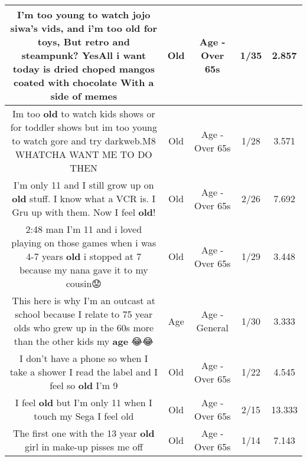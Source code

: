\documentclass[11pt]{article}
\newlength\mylength
\begin{document}
\begin{center}
\begin{longtable}{|C{.65\mylength}|C{.30\mylength}|C{.12\mylength}|C{.12\mylength}|C{.12\mylength}|}
  \small I'm too young to watch jojo siwa's vids, and i'm too \textbf{old} for toys, But retro and steampunk? YesAll i want today is dried choped mangos coated with chocolate  With a side of memes\normalsize   & Old & Age - Over 65s & 1/35 & 2.857 \\  \hline
  \small Im too \textbf{old} to watch kids shows or for toddler shows but im too young to watch gore and try darkweb.M8 WHATCHA WANT ME TO DO THEN\normalsize   & Old & Age - Over 65s & 1/28 & 3.571 \\  \hline
  \small I'm only 11 and I still grow up on \textbf{old} stuff. I know what a VCR is. I Gru up with them. Now I feel \textbf{old}!\normalsize   & Old & Age - Over 65s & 2/26 & 7.692 \\  \hline
  \small 2:48 man I'm 11 and i loved playing on those games when i was 4-7 years \textbf{old} i stopped at 7 because my nana gave it to my cousin😟\normalsize   & Old & Age - Over 65s & 1/29 & 3.448 \\  \hline
  \small This here is why I'm an outcast at school because I relate to 75 year olds who grew up in the 60s more than the other kids my \textbf{age} 😂😂\normalsize   & Age & Age - General & 1/30 & 3.333 \\  \hline
  \small I don't have a phone so when I take a shower I read the label and I feel so \textbf{old} I'm 9\normalsize   & Old & Age - Over 65s & 1/22 & 4.545 \\  \hline
  \small I feel \textbf{old} but I'm only 11 when I touch my Sega I feel old\normalsize   & Old & Age - Over 65s & 2/15 & 13.333 \\  \hline
  \small The first one with the 13 year \textbf{old} girl in make-up pisses me off\normalsize   & Old & Age - Over 65s & 1/14 & 7.143 \\  \hline

\end{longtable}
\end{center}
\end{document}
